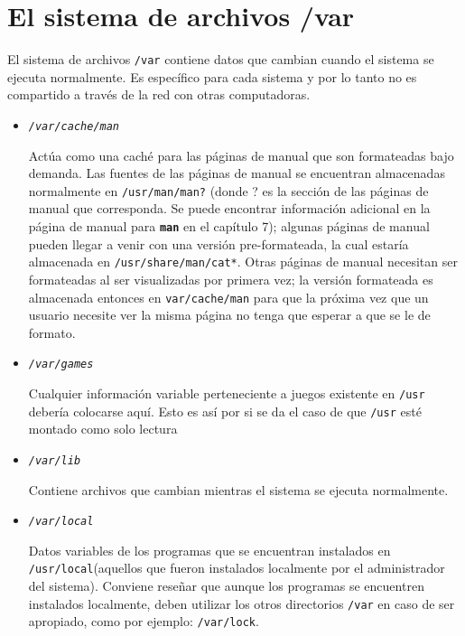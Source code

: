 \section{ El sistema de archivos /var}
    
    El sistema de archivos \texttt{/var} contiene datos que
    cambian cuando el sistema se ejecuta normalmente. Es específico para cada
    sistema y por lo tanto no es compartido a través de la red con otras
    computadoras. 

	\begin{itemize}  

	\item 
        
	\textit{\texttt{/var/cache/man}} 
        
	 Actúa como una caché para las páginas de manual que son
	formateadas bajo demanda. Las fuentes de las páginas de manual se
	encuentran almacenadas normalmente en \texttt{/usr/man/man?}
	(donde ? es la sección de las páginas de manual que corresponda. Se
	puede 	encontrar información adicional en la página de manual para
	\texttt{\textbf{man}} en el capítulo 7); algunas páginas de manual
	pueden 	llegar a venir con una versión pre-formateada, la cual estaría
	almacenada 	en \texttt{/usr/share/man/cat*}. Otras
	páginas de manual necesitan ser formateadas al ser visualizadas por
	primera vez; la versión formateada es almacenada entonces en
	\texttt{var/cache/man} para que la próxima vez que un
	usuario necesite ver la misma página no tenga que esperar a que se le de
	formato.  

	\item 
        
	\textit{\texttt{/var/games}} 
        
	 Cualquier información variable perteneciente a juegos
	existente en \texttt{/usr} debería colocarse aquí. Esto es
	así por si se da el caso de que \texttt{/usr} esté montado
	como 		solo lectura 

	\item 

	\textit{\texttt{/var/lib}} 
    
	 Contiene archivos que cambian mientras el sistema se
	ejecuta normalmente. 

	\item 
        

	\textit{\texttt{/var/local}} 
        
	 Datos variables de los programas que se encuentran
	instalados en \texttt{/usr/local}(aquellos que fueron
	instalados localmente por el administrador del sistema). Conviene
	reseñar  		que aunque los programas se encuentren
	instalados localmente, deben 			utilizar los otros
	directorios \texttt{/var} en caso de ser
	apropiado, como por ejemplo:
	\texttt{/var/lock}.  


\end{itemize}
